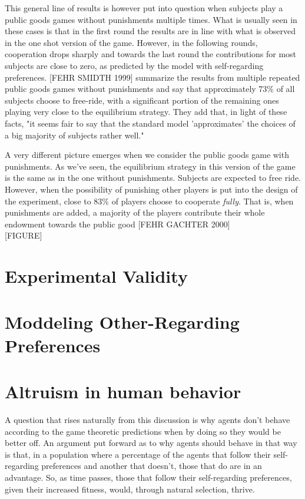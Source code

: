 \message{ !name(tese.tex)}\documentclass{article}
\begin{document}
This general line of results is however put into question when subjects play a public goods games without punishments multiple times. What is usually seen in these cases is that in the first round the results are in line with what is observed in the one shot version of the game. However, in the following rounds, cooperation drops sharply and towards the last round the contributions for most subjects are close to zero, as predicted by the model with self-regarding preferences. [FEHR SMIDTH 1999] summarize the results from multiple repeated public goods games without punishments and say that approximately 73\% of all subjects choose to free-ride, with a significant portion of the remaining ones playing very close to the equilibrium strategy. They add that, in light of these facts, "it seems fair to say that the standard model 'approximates' the choices of a big majority of subjects rather well."

A very different picture emerges when we consider the public goods game with punishments. As we've seen, the equilibrium strategy in this version of the game is the same as in the one without punishments. Subjects are expected to free ride. However, when the possibility of punishing other players is put into the design of the experiment, close to 83\% of players choose to cooperate \textit{fully}. That is, when punishments are added, a majority of the players contribute their whole endowment towards the public good [FEHR GACHTER 2000]
\\

[FIGURE]
\\





\newpage
\section{Experimental Validity}

\newpage

\section{Moddeling Other-Regarding Preferences}

\newpage

\section{Altruism in human behavior}

A question that rises naturally from this discussion is why agents don't behave according to the game theoretic predictions when by doing so they would be better off. An argument put forward as to why agents should behave in that way is that, in a population where a percentage of the agents that follow their self-regarding preferences and another that doesn't, those that do are in an advantage. So, as time passes, those that follow their self-regarding preferences, given their increased fitness, would, through natural selection, thrive.
\end{document}
